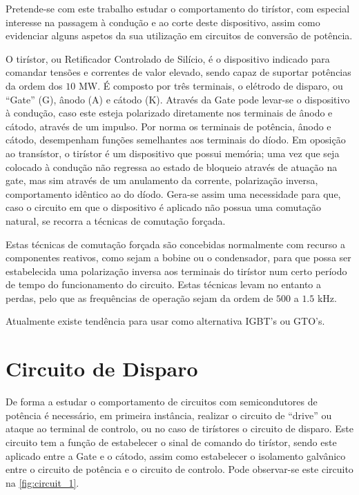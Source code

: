 \documentclass[a4paper,11pt]{article}
\numberwithin{equation}{section}
\begin{document}
Pretende-se com este trabalho estudar o comportamento do tirístor, com especial interesse na passagem à condução e ao corte deste dispositivo, assim como evidenciar alguns aspetos da sua utilização em circuitos de conversão de potência.

O tirístor, ou Retificador Controlado de Silício, é o dispositivo indicado para comandar tensões e correntes de valor elevado, sendo capaz de suportar potências da ordem dos $10$ MW. É composto por três terminais, o elétrodo de disparo, ou “Gate” (G), ânodo (A) e cátodo (K). Através da Gate pode levar-se o dispositivo à condução, caso este esteja polarizado diretamente nos terminais de ânodo e cátodo, através de um impulso. Por norma os terminais de potência, ânodo e cátodo, desempenham funções semelhantes aos terminais do díodo. Em oposição ao transístor, o tirístor é um dispositivo que possui memória; uma vez que seja colocado à condução não regressa ao estado de bloqueio através de atuação na gate, mas sim através de um anulamento da corrente, polarização inversa, comportamento idêntico ao do díodo. Gera-se assim uma necessidade para que, caso o circuito em que o dispositivo é aplicado não possua uma comutação natural, se recorra a técnicas de comutação forçada.

Estas técnicas de comutação forçada são concebidas normalmente com recurso a componentes reativos, como sejam a bobine ou o condensador, para que possa ser estabelecida uma polarização inversa aos terminais do tirístor num certo período de tempo do funcionamento do circuito. Estas técnicas levam no entanto a perdas, pelo que as frequências de operação sejam da ordem de $500$ a $1.5$ kHz.

Atualmente existe tendência para usar como alternativa IGBT’s ou GTO’s.

\section{Circuito de Disparo}

De forma a estudar o comportamento de circuitos com semicondutores de potência é necessário, em primeira instância, realizar o circuito de “drive” ou ataque ao terminal de controlo, ou no caso de tirístores o circuito de disparo. Este circuito tem a função de estabelecer o sinal de comando do tirístor, sendo este aplicado entre a Gate e o cátodo, assim como estabelecer o isolamento galvânico entre o circuito de potência e o circuito de controlo. Pode observar-se este circuito na \autoref{fig:circuit_1}.
\end{document}
